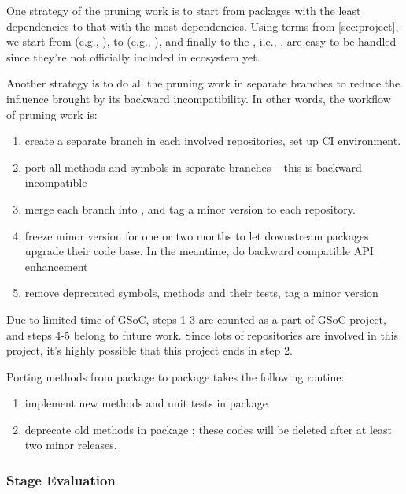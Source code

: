 One strategy of the pruning work is to start from packages with the least dependencies to that with the most dependencies. Using terms from \cref{sec:project}, we start from  (e.g., \repoimagecore{}), to  (e.g., \repoimagetransformations{}), and finally to the , i.e., \repoimages{}.  are easy to be handled since they're not officially included in \images{} ecosystem yet. \par

\newcommand{\packageA}{package \sname{A}\xspace}
\newcommand{\packageB}{package \sname{B}\xspace}
Another strategy is to do all the pruning work in separate branches to reduce the influence brought by its backward incompatibility. In other words, the workflow of pruning work is:
\begin{enumerate}
    \item create a separate branch  in each involved repositories, set up CI environment.
    \item port all methods and symbols in separate branches -- this is backward incompatible
    \item merge each branch into , and tag a minor version to each repository.
    \item freeze minor version for one or two months to let downstream packages upgrade their code base. In the meantime, do backward compatible API enhancement
    \item remove deprecated symbols, methods and their tests, tag a minor version
\end{enumerate}
Due to limited time of GSoC, steps 1-3 are counted as a part of GSoC project, and steps 4-5 belong to future work. Since lots of repositories are involved in this project, it's highly possible that this project ends in step 2.\par

Porting methods from \packageA to \packageB takes the following routine:
\begin{enumerate}
    \item implement new methods and unit tests in \packageB
    \item deprecate old methods in \packageA; these codes will be deleted after at least two minor releases.
\end{enumerate}

\subsubsection*{Stage Evaluation}

